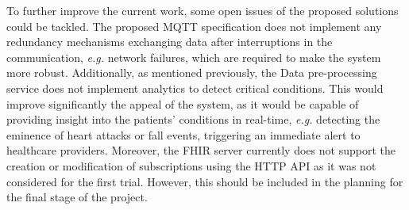 To further improve the current work, some open issues of the proposed solutions could be tackled. The proposed \acs{MQTT} specification does not implement any redundancy mechanisms exchanging data after interruptions in the communication, \textit{e.g.} network failures, which are required to make the system more robust. Additionally, as mentioned previously, the Data pre-processing service does not implement analytics to detect critical conditions. This would improve significantly the appeal of the system, as it would be capable of providing insight into the patients' conditions in real-time, \textit{e.g.} detecting the eminence of heart attacks or fall events, triggering an immediate alert to healthcare providers. Moreover, the \acs{FHIR} server currently does not support the creation or modification of subscriptions using the \acs{HTTP} \acs{API} as it was not considered for the first trial. However, this should be included in the planning for the final stage of the project. 